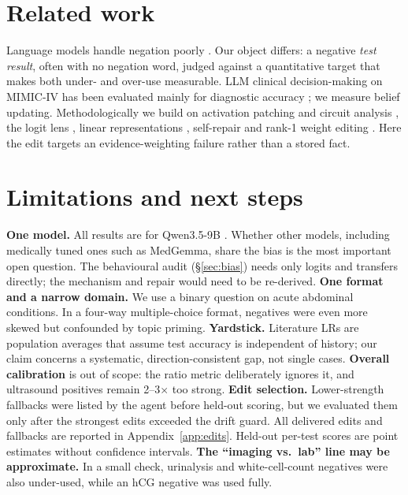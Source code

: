 \documentclass[10pt]{article}
\begin{document}
\section{Related work}

Language models handle negation poorly \citep{ettinger2020bert,kassner2020negated,truong2023naysayers}. Our object differs: a negative \emph{test result}, often with no negation word, judged against a quantitative target that makes both under- and over-use measurable. LLM clinical decision-making on MIMIC-IV has been evaluated mainly for diagnostic accuracy \citep{hager2024evaluation}; we measure belief updating. Methodologically we build on activation patching and circuit analysis \citep{wang2023ioi,zhang2024patching}, the logit lens \citep{nostalgebraist2020logitlens}, linear representations \citep{marks2023geometry}, self-repair \citep{mcgrath2023hydra} and rank-1 weight editing \citep{meng2022rome}. Here the edit targets an evidence-weighting failure rather than a stored fact.

\section{Limitations and next steps}

\textbf{One model.} All results are for Qwen3.5-9B \citep{qwen35}. Whether other models, including medically tuned ones such as MedGemma, share the bias is the most important open question. The behavioural audit (\S\ref{sec:bias}) needs only logits and transfers directly; the mechanism and repair would need to be re-derived. \textbf{One format and a narrow domain.} We use a binary question on acute abdominal conditions. In a four-way multiple-choice format, negatives were even more skewed but confounded by topic priming. \textbf{Yardstick.} Literature LRs are population averages that assume test accuracy is independent of history; our claim concerns a systematic, direction-consistent gap, not single cases. \textbf{Overall calibration} is out of scope: the ratio metric deliberately ignores it, and ultrasound positives remain 2--3$\times$ too strong. \textbf{Edit selection.} Lower-strength fallbacks were listed by the agent before held-out scoring, but we evaluated them only after the strongest edits exceeded the drift guard. All delivered edits and fallbacks are reported in Appendix~\ref{app:edits}. Held-out per-test scores are point estimates without confidence intervals. \textbf{The ``imaging vs.\ lab'' line may be approximate.} In a small check, urinalysis and white-cell-count negatives were also under-used, while an hCG negative was used fully.
\end{document}
